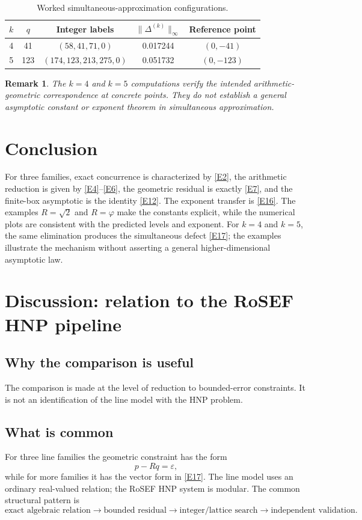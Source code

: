 \documentclass[12pt]{article}
\newtheorem{remark}[theorem]{Remark}
\newcommand{\norm}[1]{\lVert #1\rVert}
\begin{document}
\begin{table}[H]
\centering
\caption{Worked simultaneous-approximation configurations.}
\begin{tabular}{@{}ccccc@{}}
\toprule
$k$ & $q$ & Integer labels & $\norm{\Delta^{(k)}}_\infty$ & Reference point\\
\midrule
4 & 41 & $(58,41,71,0)$ & 0.017244 & $(0,-41)$\\
5 & 123 & $(174,123,213,275,0)$ & 0.051732 & $(0,-123)$\\
\bottomrule
\end{tabular}
\end{table}

\begin{remark}
The $k=4$ and $k=5$ computations verify the intended arithmetic-geometric correspondence at concrete points. They do not establish a general asymptotic constant or exponent theorem in simultaneous approximation.
\end{remark}

\section{Conclusion}
For three families, exact concurrence is characterized by \eqref{E2}, the arithmetic reduction is given by \eqref{E4}--\eqref{E6}, the geometric residual is exactly \eqref{E7}, and the finite-box asymptotic is the identity \eqref{E12}. The exponent transfer is \eqref{E16}. The examples $R=\sqrt2$ and $R=\varphi$ make the constants explicit, while the numerical plots are consistent with the predicted levels and exponent. For $k=4$ and $k=5$, the same elimination produces the simultaneous defect \eqref{E17}; the examples illustrate the mechanism without asserting a general higher-dimensional asymptotic law.

\section{Discussion: relation to the RoSEF HNP pipeline}

\subsection{Why the comparison is useful}
The comparison is made at the level of reduction to bounded-error constraints. It is not an identification of the line model with the HNP problem.

\subsection{What is common}
For three line families the geometric constraint has the form
\[
p-Rq=\varepsilon,
\]
while for more families it has the vector form in \eqref{E17}. The line model uses an ordinary real-valued relation; the RoSEF HNP system is modular. The common structural pattern is
\[
\text{exact algebraic relation}
\longrightarrow
\text{bounded residual}
\longrightarrow
\text{integer/lattice search}
\longrightarrow
\text{independent validation}.
\]
\end{document}
